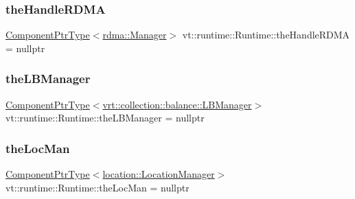 \subsubsection{\texorpdfstring{the\+Handle\+R\+D\+MA}{theHandleRDMA}}
{\footnotesize\ttfamily \hyperlink{structvt_1_1runtime_1_1_runtime_a0893bf0a8c03b898e8ab66b52cec80ad}{Component\+Ptr\+Type}$<$\hyperlink{structvt_1_1rdma_1_1_manager}{rdma\+::\+Manager}$>$ vt\+::runtime\+::\+Runtime\+::the\+Handle\+R\+D\+MA = nullptr}

\mbox{\label{structvt_1_1runtime_1_1_runtime_a0d324f5964ce89e2974a41bc3129829e}} 
\subsubsection{\texorpdfstring{the\+L\+B\+Manager}{theLBManager}}
{\footnotesize\ttfamily \hyperlink{structvt_1_1runtime_1_1_runtime_a0893bf0a8c03b898e8ab66b52cec80ad}{Component\+Ptr\+Type}$<$\hyperlink{structvt_1_1vrt_1_1collection_1_1balance_1_1_l_b_manager}{vrt\+::collection\+::balance\+::\+L\+B\+Manager}$>$ vt\+::runtime\+::\+Runtime\+::the\+L\+B\+Manager = nullptr}

\mbox{\label{structvt_1_1runtime_1_1_runtime_ae198134b20e8c3787f16f4e790f95d9a}} 
\subsubsection{\texorpdfstring{the\+Loc\+Man}{theLocMan}}
{\footnotesize\ttfamily \hyperlink{structvt_1_1runtime_1_1_runtime_a0893bf0a8c03b898e8ab66b52cec80ad}{Component\+Ptr\+Type}$<$\hyperlink{structvt_1_1location_1_1_location_manager}{location\+::\+Location\+Manager}$>$ vt\+::runtime\+::\+Runtime\+::the\+Loc\+Man = nullptr}

\mbox{\label{structvt_1_1runtime_1_1_runtime_a99d9a28de0742915ca6b25393807dd8b}} 
